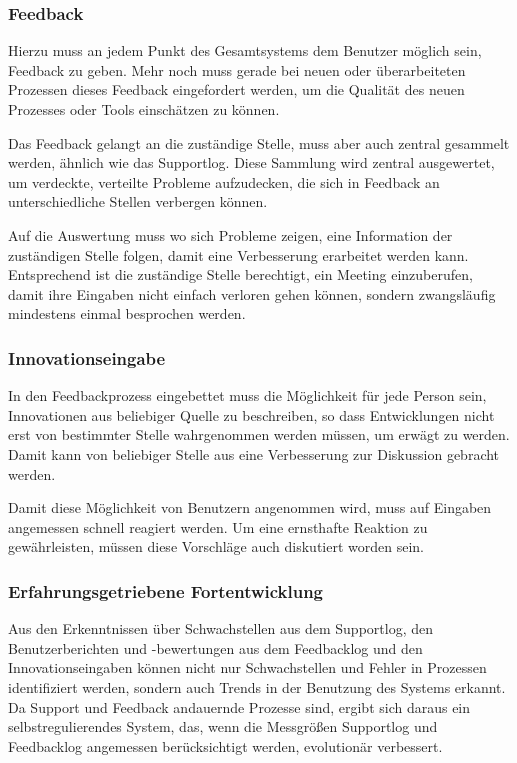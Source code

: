 \subsubsection{Feedback}
Hierzu muss an jedem Punkt des Gesamtsystems dem Benutzer möglich sein, Feedback zu geben. Mehr noch muss gerade bei neuen oder überarbeiteten Prozessen dieses Feedback eingefordert werden, um die Qualität des neuen Prozesses oder Tools einschätzen zu können.

Das Feedback gelangt an die zuständige Stelle, muss aber auch zentral gesammelt werden, ähnlich wie das Supportlog. Diese Sammlung wird zentral ausgewertet, um verdeckte, verteilte Probleme aufzudecken, die sich in Feedback an unterschiedliche Stellen verbergen können.

Auf die Auswertung muss wo sich Probleme zeigen, eine Information der zuständigen Stelle folgen, damit eine Verbesserung erarbeitet werden kann. Entsprechend ist die zuständige Stelle berechtigt, ein Meeting einzuberufen, damit ihre Eingaben nicht einfach verloren gehen können, sondern zwangsläufig mindestens einmal besprochen werden.

\subsubsection{Innovationseingabe}
In den Feedbackprozess eingebettet muss die Möglichkeit für jede Person sein, Innovationen aus beliebiger Quelle zu beschreiben, so dass Entwicklungen nicht erst von bestimmter Stelle wahrgenommen werden müssen, um erwägt zu werden. Damit kann von beliebiger Stelle aus eine Verbesserung zur Diskussion gebracht werden.

Damit diese Möglichkeit von Benutzern angenommen wird, muss auf Eingaben angemessen schnell reagiert werden. Um eine ernsthafte Reaktion zu gewährleisten, müssen diese Vorschläge auch diskutiert worden sein.

\subsubsection{Erfahrungsgetriebene Fortentwicklung}
Aus den Erkenntnissen über Schwachstellen aus dem Supportlog, den Benutzerberichten und -bewertungen aus dem Feedbacklog und den Innovationseingaben können nicht nur Schwachstellen und Fehler in Prozessen identifiziert werden, sondern auch Trends in der Benutzung des Systems erkannt. Da Support und Feedback andauernde Prozesse sind, ergibt sich daraus ein selbstregulierendes System, das, wenn die Messgrößen Supportlog und Feedbacklog angemessen berücksichtigt werden, evolutionär verbessert.

